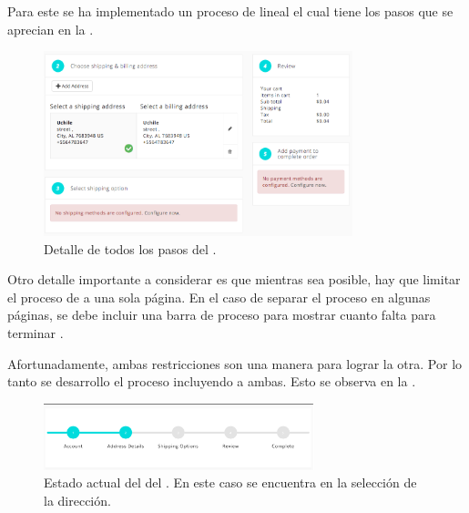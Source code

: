 	Para este \frameworkPC se ha implementado un proceso de \checkoutEF lineal el cual tiene los pasos que se aprecian en la .


	\begin{figure}[!h]
		\centering
		\includegraphics[width=0.8\textwidth]{figuras/shipping/steps.png}
		\caption{Detalle de todos los pasos del \workflowCPT \shippingEF.}
		\label{figure:checkout:steps}
	\end{figure}

	Otro detalle importante a considerar es que mientras sea posible, hay que limitar el proceso de \checkoutEF a una sola página. En el caso de separar el proceso en algunas páginas, se debe incluir una barra de proceso para mostrar cuanto falta para terminar \cite{online_official_imediaconnection_best_practices_shopping_cart}.

	Afortunadamente, ambas restricciones son una manera para lograr la otra. Por lo tanto se desarrollo el proceso incluyendo a ambas. Esto se observa en la .

	\begin{figure}[H]
		\centering
		\includegraphics[width=0.7\textwidth]{figuras/shipping/global_status.png}
		\caption{Estado actual del \workflowCPT del \shippingEF. En este caso se encuentra en la selección de la dirección.}
		\label{figure:checkout:global_status}
	\end{figure}

